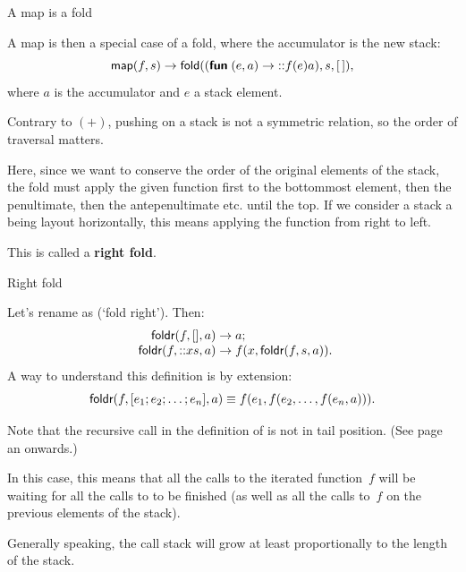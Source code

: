 %
\begin{frame}{A map is a fold}

  A map is then a special case of a fold, where the accumulator is the
  new stack:
  \begin{equation*}
    \textsf{map}(f, s)
    \rightarrow \textsf{fold}((\textsf{\textbf{fun}}\; (e, a) \rightarrow \textsf{::}{f(e)}{a}), s, [\,]),
  \end{equation*}
  where $a$ is the accumulator and $e$ a stack element.

  \bigskip

  Contrary to $(+)$, pushing on a stack is not a symmetric relation,
  so the order of traversal matters.

  \bigskip

  Here, since we want to conserve the order of the original elements
  of the stack, the fold must apply the given function first to the
  bottommost element, then the penultimate, then the antepenultimate
  etc. until the top. If we consider a stack a being layout
  horizontally, this means applying the function from right to left.

  \bigskip

  This is called a \textbf{right fold}.

\end{frame}

%
\begin{frame}{Right fold}

  Let's rename  as  (`fold right'). Then:
  \begin{equation*}
    \begin{array}{r@{\;}c@{\;}l@{}}
      \fun{foldr} (f, [], a) & \rightarrow & a;\\
      \fun{foldr} (f, \cons{x}{s}, a) & \rightarrow & f(x, \fun{foldr}(f, s, a)).
    \end{array}
  \end{equation*}
  A way to understand this definition is by extension:
  \begin{equation*}
    \textsf{foldr}(f,[e_1; e_2; \ldots; e_n], a) \equiv f(e_1, f(e_2,
    \ldots, f(e_n, a))).
  \end{equation*}

  Note that the recursive call in the definition of  is
  not in tail position. (See page~\pageref{tail_call} an onwards.)

  \bigskip

  In this case, this means that all the calls to the iterated
  function~$f$ will be waiting for all the calls to  to be
  finished (as well as all the calls to~$f$ on the previous elements
  of the stack).

  \bigskip

  Generally speaking, the call stack will grow at least proportionally
  to the length of the stack.

\end{frame}

